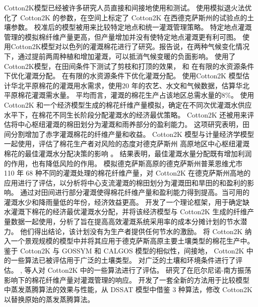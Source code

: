 Cotton2K模型已经被许多研究人员直接和间接地使用和测试。
 使用模拟退火法优化了 Cotton2K 的参数，在空间上标定了 Cotton2K 在西德克萨斯州的试验点的土壤参数。
校准后的模型被用来比较特定地点和统一灌溉管理策略。
特定地点灌溉管理的模拟棉纤维产量更高，但产量增加并没有使特定地点灌溉更有利可图。
 使用Cotton2K模型对以色列的灌溉棉花进行了研究。报告说，在两种气候变化情况下，通过提前两周种植和增加灌溉，可以抵消气候变暖的负面影响。
 使用了Cotton2K模型，在田间条件下测试了剪枝和打顶的效果，
 和  在有限的水资源条件下优化灌溉分配。
在有限的水资源条件下优化灌溉分配。
 使用Cotton2K 模型估计华北平原棉花的灌溉用水需求，使用20 年的农艺、水文和气候数据，估算华北平原棉花灌溉需水量。
平均而言，灌溉的棉花生产占该地区总需水量的8\%。
 使用 Cotton2K 和一个经济模型生成的棉花纤维产量模拟，确定在不同次优灌溉水供应水平下，在棉花不同生长阶段分配灌溉水的经济最优策略。
Cotton2K 还被用来评估将中心枢纽灌溉的棉田划分为灌溉和雨养部分的盈利能力\cite{nair2013}。
这项研究表明，田间分割增加了赤字灌溉棉花的纤维产量和收益。
Cotton2K 模型与计量经济学模型一起使用，评估了棉花生产者对风险的态度对德克萨斯州 高原地区中心枢纽灌溉棉花的最佳灌溉水分配决策的影响 \cite{nair2011}。
结果表明，最佳灌溉水量分配既有增加利润的作用，也有降低风险的作用。
 模拟德克萨斯高原的德克萨斯州普莱恩维尤市 110 年 68 种不同的灌溉处理的棉花纤维产量，对 Cotton2K 在德克萨斯州高地的应用进行了评估，以分析将中心支流灌溉的棉田划分为灌溉田和旱田的和盈利的影响。
通过对田间进行部分灌溉使得棉花纤维产量和盈利能力得到提高。当可用的灌溉水少和降雨量低的年份，经济效益更高。
 开发了一个理论框架，用于确定缺水灌溉下棉花的经济最优灌溉水分配，并将该经济模型与 Cotton2K 生成的纤维产量数据一起使用，分析了旨在提高高效灌溉系统采用率的成本分摊计划的节水潜力。
他们得出结论，该计划没有为生产者提供任何节水的激励。
 将 Cotton2K 纳入一个景观规模的模型中并将其应用于德克萨斯高原主要土壤类型的棉花生产中。
鉴于 Cotton2K 与 GOSSYM 和 CALGOS 模型的相似性，间接地， Cotton2K 中的一些算法已被评估用于广泛的土壤类型。
 对广泛的土壤和环境条件进行了评估。
,  等人对 Cotton2K 中的一些算法进行了评估。
 研究了在厄尔尼诺-南方振荡影响下的棉花纤维产量对灌溉管理的响应。
 开发了一套全新的方法用于比较模型中蒸发蒸腾算法的效果与性能，从 DSSAT 模型中借鉴 3 种算法，修改 Cotton2K 以替换原始的蒸发蒸腾算法。

